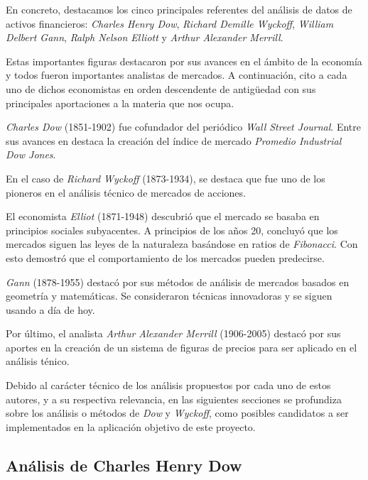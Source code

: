 En concreto, destacamos los cinco principales referentes del análisis de datos de activos financieros: \textit{Charles Henry Dow}, \textit{Richard Demille Wyckoff}, \textit{William Delbert Gann}, \textit{Ralph Nelson Elliott} y \textit{Arthur Alexander Merrill}. \newline

Estas importantes figuras destacaron por sus avances en el ámbito de la economía y todos fueron importantes analistas de mercados. A continuación, cito a cada uno de dichos economistas en orden descendente de antigüedad con sus principales aportaciones a la materia que nos ocupa. \newline

\textit{Charles Dow} (1851-1902) fue cofundador del periódico \textit{Wall Street Journal}. Entre sus avances en destaca la creación del índice de mercado \textit{Promedio Industrial Dow Jones}. \newline

En el caso de \textit{Richard Wyckoff} (1873-1934), se destaca que fue uno de los pioneros en el análisis técnico de mercados de acciones. \newline

El economista \textit{Elliot} (1871-1948) descubrió que el mercado se basaba en principios sociales subyacentes. A principios de los años 20, concluyó que los mercados siguen las leyes de la naturaleza basándose en ratios de \textit{Fibonacci}. Con esto demostró que el comportamiento de los mercados pueden predecirse.  \newline

\textit{Gann} (1878-1955) destacó por sus métodos de análisis de mercados basados en geometría y matemáticas. Se consideraron técnicas innovadoras y se siguen usando a día de hoy. \newline

Por último, el analista \textit{Arthur Alexander Merrill} (1906-2005) destacó por sus aportes en la creación de un sistema de figuras de precios para ser aplicado en el análisis ténico. \newline

Debido al carácter técnico de los análisis propuestos por cada uno de estos autores, y a su respectiva relevancia, en las siguientes secciones se profundiza sobre los análisis o métodos de \textit{Dow} y \textit{Wyckoff}, como posibles candidatos a ser implementados en la aplicación objetivo de este proyecto. \newline

\subsection{Análisis de Charles Henry Dow}

